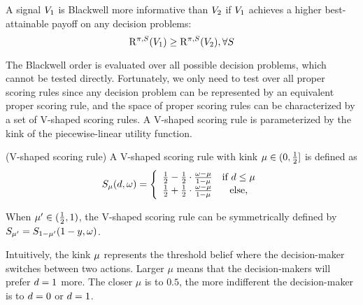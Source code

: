 \begin{definition}
    A signal $V_1$ is Blackwell more informative than $V_2$ if $V_1$ achieves a higher best-attainable payoff on any decision problems:
    \begin{equation*}
        \mathrm{R}^{\pi, S}
(V_1)\geq \mathrm{R}^{\pi, S}
(V_2), \forall S
    \end{equation*}
\end{definition}
 \mvspace{-4mm}

The Blackwell order is evaluated over all possible decision problems, which cannot be tested directly.
Fortunately, we only need to test over all proper scoring rules since any decision problem can be represented by an equivalent proper scoring rule, and the space of proper scoring rules can be characterized by a set of V-shaped scoring rules.
A V-shaped scoring rule is parameterized by the kink of the piecewise-linear utility function.



\begin{definition}(V-shaped scoring rule)
 \label{def:V-shaped score}
 A V-shaped scoring rule with kink $\mu\in (0, \frac{1}{2}]$ is defined as    \begin{equation}
      S_{\mu} (d, \omega) = \left\{\begin{array}{cc}
      \frac{1}{2} -\frac{1}{2}\cdot \frac{\omega - \mu}{1-\mu}  &  \text{if }d\leq \mu\\
        \frac{1}{2} +\frac{1}{2}\cdot \frac{\omega - \mu}{1-\mu}    & \text{else},
      \end{array}
      \right.\nonumber
   \end{equation}

When $\mu'\in (\frac{1}{2}, 1)$, the V-shaped scoring rule can be symmetrically defined by $S_{\mu'} = S_{1-\mu'}(1-y, \omega)$.
\end{definition}

 \mvspace{-2mm}

Intuitively, the kink $\mu$ represents the threshold belief where the decision-maker switches between two actions.
Larger $\mu$ means that the decision-makers will prefer $d = 1$ more. The closer $\mu$ is to $0.5$, the more indifferent the decision-maker is to $d = 0$ or $d = 1$.

